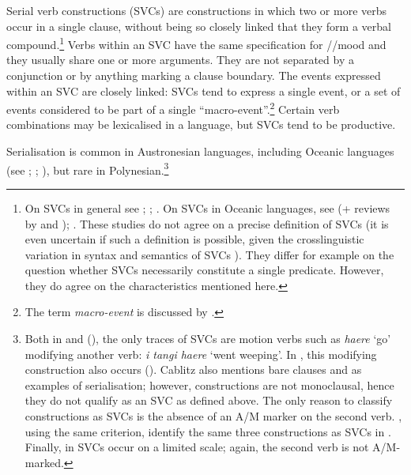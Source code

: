 Serial verb constructions (SVCs) are constructions in which two or more verbs occur in a single clause, without being so closely linked that they form a verbal compound.\footnote{\label{fn:370}On SVCs in general see \citet{Durie1988,Durie1997}; \citet{AikhenvaldDixon2006}; \citet{Sebba1987}. On SVCs in Oceanic languages, see \citet{Crowley2002} (+ reviews by \citet{Owens2002} and \citet{Bradshaw2004}); \citet{Senft2008}. These studies do not agree on a precise definition of SVCs (it is even uncertain if such a definition is possible, given the crosslinguistic variation in syntax and semantics of SVCs \citep[19]{Crowley2002}). They differ for example on the question whether SVCs necessarily constitute a single predicate. However, they do agree on the characteristics mentioned here.} Verbs within an SVC have the same specification for //mood and they usually share one or more arguments. They are not separated by a conjunction or by anything marking a clause boundary. The events expressed within an SVC are closely linked: SVCs tend to express a single event, or a set of events considered to be part of a single “macro-event”.\footnote{\label{fn:371}The term \textit{macro-event} is discussed by \citet{Aikhenvald2006}.}  Certain verb combinations may be lexicalised in a language, but SVCs tend to be productive.

Serialisation is common in Austronesian languages, including Oceanic languages (see \citealt{Crowley2002}; \citealt{Senft2008}; \citealt{Durie1988}), but rare in Polynesian.\footnote{\label{fn:372}Both in  \citep[150]{Harlow2007Maori} and  (\citet[203]{AcadémieTahitienne1986}), the only traces of SVCs are motion verbs such as \textit{haere} ‘go’ modifying another verb:  \textit{i tangi haere} ‘went weeping’. In , this modifying construction also occurs (\citealt[205–206]{Cablitz2006}). Cablitz also mentions bare  clauses and  as examples of serialisation; however,  constructions are not monoclausal, hence they do not qualify as an SVC as defined above. The only reason to classify  constructions as SVCs is the absence of an A/M marker on the second verb. \citet[397]{MoselHovdhaugen1992}, using the same criterion, identify the same three constructions as SVCs in . Finally, in  \citep[538]{Besnier2000} SVCs occur on a limited scale; again, the second verb is not A/M-marked.} 

